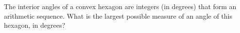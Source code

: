 The interior angles of a convex hexagon are integers (in degrees) that form an arithmetic sequence. What is the largest possible measure of an angle of this hexagon, in degrees?
